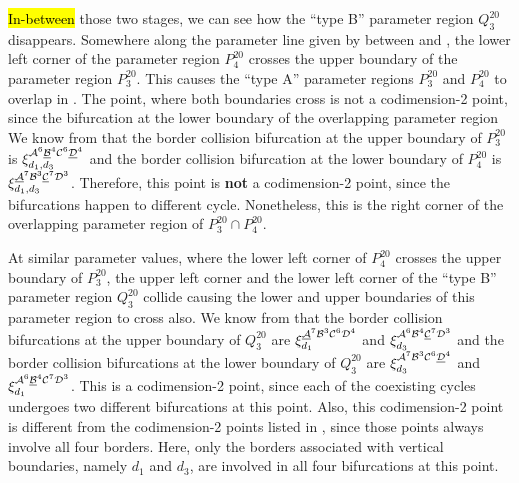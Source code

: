\hl{In-between} those two stages, we can see how the ``type B'' parameter region $Q^{20}_3$ disappears.
Somewhere along the parameter line given by  between  and , the lower left corner of the parameter region $P^{20}_4$ crosses the upper boundary of the parameter region $P^{20}_3$.
This causes the ``type A'' parameter regions $P^{20}_3$ and $P^{20}_4$ to overlap in .
The point, where both boundaries cross is not a codimension-2 point, since the bifurcation at the lower boundary of the overlapping parameter region
We know from  that the border collision bifurcation at the upper boundary of $P^{20}_3$ is $\xi_{d_1, d_3}^{\mathcal{A}^6\underline{\mathcal{B}}^4\mathcal{C}^6\underline{\mathcal{D}}^4}$ and the border collision bifurcation at the lower boundary of $P^{20}_4$ is $\xi_{d_1, d_3}^{\underline{\mathcal{A}}^7\mathcal{B}^3\underline{\mathcal{C}}^7\mathcal{D}^3}$.
Therefore, this point is \textbf{not} a codimension-2 point, since the bifurcations happen to different cycle.
Nonetheless, this is the right corner of the overlapping parameter region of $P^{20}_3 \cap P^{20}_4$.

At similar parameter values, where the lower left corner of $P^{20}_4$ crosses the upper boundary of $P^{20}_3$, the upper left corner and the lower left corner of the ``type B'' parameter region $Q^{20}_3$ collide causing the lower and upper boundaries of this parameter region to cross also.
We know from  that the border collision bifurcations at the upper boundary of $Q^{20}_3$ are $\xi_{d_1}^{\underline{\mathcal{A}}^7\mathcal{B}^3\mathcal{C}^6\mathcal{D}^4}$ and $\xi_{d_3}^{\mathcal{A}^6\mathcal{B}^4\underline{\mathcal{C}}^7\mathcal{D}^3}$ and the border collision bifurcations at the lower boundary of $Q^{20}_3$ are $\xi_{d_3}^{\mathcal{A}^7\mathcal{B}^3\mathcal{C}^6\underline{\mathcal{D}}^4}$ and $\xi_{d_1}^{\mathcal{A}^6\underline{\mathcal{B}}^4\mathcal{C}^7\mathcal{D}^3}$.
This is a codimension-2 point, since each of the coexisting cycles undergoes two different bifurcations at this point.
Also, this codimension-2 point is different from the codimension-2 points listed in , since those points always involve all four borders.
Here, only the borders associated with vertical boundaries, namely $d_1$ and $d_3$, are involved in all four bifurcations at this point.

